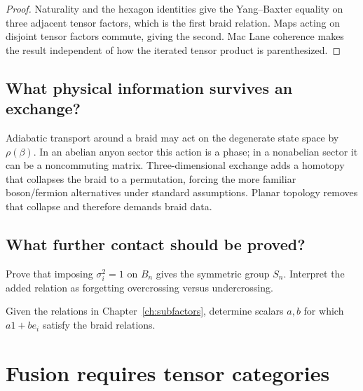 \begin{proof}
Naturality and the hexagon identities give the Yang--Baxter equality on three
adjacent tensor factors, which is the first braid relation.  Maps acting on
disjoint tensor factors commute, giving the second.  Mac Lane coherence makes
the result independent of how the iterated tensor product is parenthesized.
\end{proof}

\section{What physical information survives an exchange?}

Adiabatic transport around a braid may act on the degenerate state space by
$\rho(\beta)$.  In an abelian anyon sector this action is a phase; in a
nonabelian sector it can be a noncommuting matrix.  Three-dimensional exchange
adds a homotopy that collapses the braid to a permutation, forcing the more
familiar boson/fermion alternatives under standard assumptions.  Planar
topology removes that collapse and therefore demands braid data.

\section{What further contact should be proved?}

\begin{exercise}
Prove that imposing $\sigma_i^2=1$ on $B_n$ gives the symmetric group $S_n$.
Interpret the added relation as forgetting overcrossing versus undercrossing.
\end{exercise}

\begin{exercise}
Given the relations in Chapter~\ref{ch:subfactors}, determine scalars $a,b$
for which $a1+be_i$ satisfy the braid relations.
\end{exercise}


\chapter{Fusion requires tensor categories}
\label{ch:fusion}



